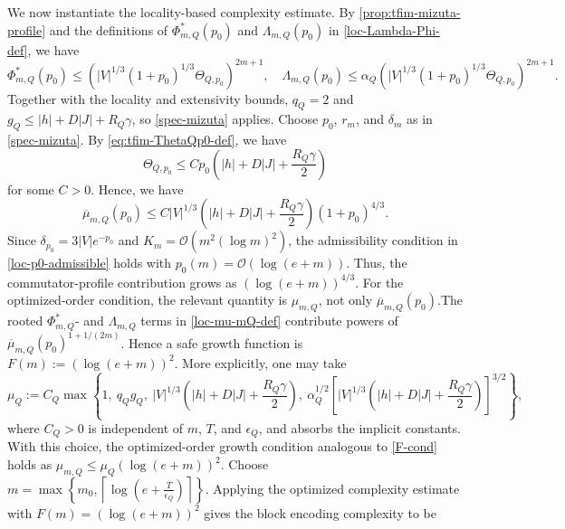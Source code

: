 \documentclass[10pt,reqno]{article}
\numberwithin{equation}{section}
\theoremstyle{plain}
\theoremstyle{definition}
\begin{document}
We now instantiate the locality-based complexity estimate. By \cref{prop:tfim-mizuta-profile} and the definitions of \(\Phi_{m,Q}^{\ast}(p_0)\) and \(\Lambda_{m,Q}(p_0)\) in \cref{loc-Lambda-Phi-def}, we have
\begin{equation}\label{eq:tfim-Phi-Lambda-bound}
\Phi_{m,Q}^{\ast}(p_0)\leq  (|V|^{1/3}(1+p_0)^{1/3}\Theta_{Q,p_0} )^{2m+1}, \quad \Lambda_{m,Q}(p_0)\leq \alpha_Q (|V|^{1/3}(1+p_0)^{1/3}\Theta_{Q,p_0} )^{2m+1}.
\end{equation}
Together with the locality and extensivity bounds, \(q_Q=2\) and \(g_Q\leq |h|+D|J|+R_Q\gamma\), so \cref{spec-mizuta} applies. Choose \(p_0\), \(r_m\), and \(\delta_m\) as in \cref{spec-mizuta}. By \cref{eq:tfim-ThetaQp0-def}, we have
\begin{equation}\label{eq:tfim-Theta-polynomial-bound}
\Theta_{Q,p_0}\leq Cp_0\left(|h|+D|J|+\frac{R_Q\gamma}{2}\right)
\end{equation}
for some \(C>0\). Hence, we have
\begin{equation}\label{eq:tfim-mubar-polynomial-bound}
\overline\mu_{m,Q}(p_0)\leq C|V|^{1/3}\left(|h|+D|J|+\frac{R_Q\gamma}{2}\right)(1+p_0)^{4/3}.
\end{equation}
Since \(\delta_{p_0}=3|V|e^{-p_0}\) and \(K_m=\mathcal O(m^2(\log m)^2)\), the admissibility condition in \cref{loc-p0-admissible} holds with \(p_0(m)=\mathcal O(\log(e+m))\). Thus, the commutator-profile contribution grows as \((\log(e+m))^{4/3}\). For the optimized-order condition, the relevant quantity is \(\mu_{m,Q}\), not only \(\overline\mu_{m,Q}(p_0)\).The rooted \(\Phi_{m,Q}^{\ast}\)- and \(\Lambda_{m,Q}\) terms in \cref{loc-mu-mQ-def} contribute powers of \(\overline\mu_{m,Q}(p_0)^{1+1/(2m)}\). Hence a safe growth function is \(F(m):=(\log(e+m))^2\). More explicitly, one may take
\begin{equation}\label{eq:tfim-muQ-choice}
\mu_Q:=C_Q\max\left\{1,\ q_Qg_Q,\ |V|^{1/3}\left(|h|+D|J|+\frac{R_Q\gamma}{2}\right),\ \alpha_Q^{1/2}\left[|V|^{1/3}\left(|h|+D|J|+\frac{R_Q\gamma}{2}\right)\right]^{3/2}\right\},
\end{equation}
where \(C_Q>0\) is independent of \(m\), \(T\), and \(\epsilon_Q\), and absorbs the implicit constants. With this choice, the optimized-order growth condition analogous to \cref{F-cond} holds as $\mu_{m,Q}\leq \mu_Q(\log(e+m))^2$.  Choose $m=\max\left\{m_0,\left\lceil\log\left(e+\frac{T}{\epsilon_Q}\right)\right\rceil\right\}$. Applying the optimized complexity estimate  with \(F(m)=(\log(e+m))^2\) gives the block encoding complexity to be
\end{document}

